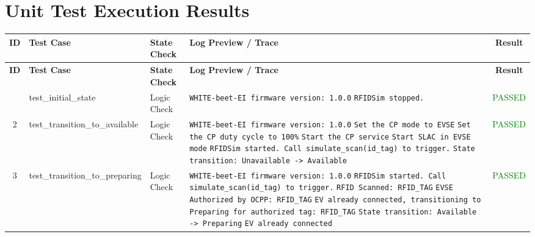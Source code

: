 \documentclass[10pt, a4paper, landscape]{article}
\begin{document}
\section*{Unit Test Execution Results}

\renewcommand{\arraystretch}{1.3}
\begin{longtable}{|c|p{6cm}|p{2.5cm}|p{8cm}|c|}
\hline
\rowcolor{gray!30}
\textbf{ID} & \textbf{Test Case} & \textbf{State Check} & \textbf{Log Preview / Trace} & \textbf{Result} \\
\hline
\endfirsthead

\hline
\hline
\rowcolor{gray!30}
\textbf{ID} & \textbf{Test Case} & \textbf{State Check} & \textbf{Log Preview / Trace} & \textbf{Result} \\
\hline
\endhead

\hline
\endfoot
1 & test\_initial\_state & Logic Check & \texttt{\scriptsize WHITE-beet-EI firmware version: 1.0.0} \newline \texttt{\scriptsize RFIDSim stopped.} & \textcolor{green}{PASSED} \\
\hline
2 & test\_transition\_to\_available & Logic Check & \texttt{\scriptsize WHITE-beet-EI firmware version: 1.0.0} \newline \texttt{\scriptsize Set the CP mode to EVSE} \newline \texttt{\scriptsize Set the CP duty cycle to 100\%} \newline \texttt{\scriptsize Start the CP service} \newline \texttt{\scriptsize Start SLAC in EVSE mode} \newline \texttt{\scriptsize RFIDSim started. Call simulate\_scan(id\_tag) to trigger.} \newline \texttt{\scriptsize State transition: Unavailable -> Available} & \textcolor{green}{PASSED} \\
\hline
3 & test\_transition\_to\_preparing & Logic Check & \texttt{\scriptsize WHITE-beet-EI firmware version: 1.0.0} \newline \texttt{\scriptsize RFIDSim started. Call simulate\_scan(id\_tag) to trigger.} \newline \texttt{\scriptsize RFID Scanned: RFID\_TAG} \newline \texttt{\scriptsize EVSE Authorized by OCPP: RFID\_TAG} \newline \texttt{\scriptsize EV already connected, transitioning to Preparing for authorized tag: RFID\_TAG} \newline \texttt{\scriptsize State transition: Available -> Preparing} \newline \texttt{\scriptsize EV already connected} & \textcolor{green}{PASSED} \\

\end{longtable}
\end{document}
